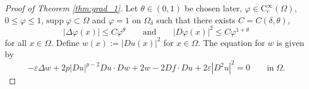 \documentclass[12pt,reqno]{amsart}
\numberwithin{figure}{section}
\theoremstyle{plain}
\theoremstyle{remark}
\numberwithin{equation}{section}
\begin{document}
\begin{proof}[Proof of Theorem \ref{thm:grad_1}] Let $\theta\in (0,1)$ be chosen later, $\varphi\in \mathrm{C}_c^\infty(\Omega)$, $0\leq \varphi\leq 1$, $\mathrm{supp}\;\varphi\subset \Omega$ and $\varphi = 1$ on $\Omega_\delta$ such that there exists $C = C(\delta,\theta)$,
\begin{equation}\label{e:ass_power}
    |\Delta \varphi(x)| \leq C\varphi^\theta \qquad\text{and}\qquad |D \varphi(x)|^2 \leq C\varphi^{1+\theta}
\end{equation}
for all $x\in \Omega$.
Define $w(x) := |Du(x)|^2$ for $x \in \Omega$. The equation for $w$ is given by
\begin{equation*}
    -\varepsilon \Delta w + 2 p|D u|^{p-2}D u \cdot D w + 2  w - 2 D f\cdot D u + 2 \varepsilon |D^2u|^2 = 0 \qquad\text{in}\;\Omega.
\end{equation*}


\end{proof}
\end{document}
